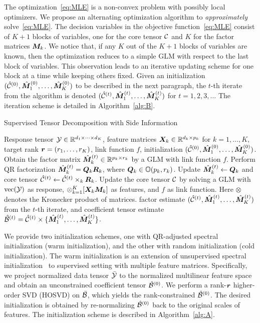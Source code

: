 \documentclass[12pt]{article}
\theoremstyle{definition}
\theoremstyle{definition}
\begin{document}
The optimization~\eqref{eq:MLE} is a non-convex problem with possibly local optimizers. We propose an alternating optimization algorithm to {\it approximately} solve~\eqref{eq:MLE}. 
The decision variables in the objective function~\eqref{eq:MLE} consist of $K+1$ blocks of variables, one for the core tensor $\mathcal{C}$ and $K$ for the factor matrices $\bm M_k$. We notice that, if any $K$ out of the $K+1$ blocks of variables are known, then the optimization reduces to a simple GLM with respect to the last block of variables. This observation leads to an iterative updating scheme for one block at a time while keeping others fixed. Given an initialization $(\hat{\mathcal{C}}^{(0)},\hat{\bm M}_1^{(0)}, \ldots, \hat{\bm M}_K^{(0)})$ to be described in the next paragraph, the $t$-th iterate from the algorithm is denoted $(\hat{\mathcal{C}}^{(t)},  \hat{\bm M}^{(t)}_1,\ldots,\hat{\bm M}^{(t)}_K)$ for $t=1, 2,3, \ldots$ The iteration scheme is detailed in Algorithm~\ref{alg:B}. 
\begin{algorithm}[!h]
\caption{Supervised Tensor Decomposition with Side Information}\label{alg:B}
\begin{algorithmic}[1]
\INPUT Response tensor $\mathcal{Y}\in \mathbb{R}^{d_1\times \cdots \times d_K}$, feature matrices $\bm X_k\in\mathbb{R}^{d_k\times p_k}$ for $k=1,\ldots,K$, target rank $\bm{r}=(r_1,\ldots,r_K)$, link function $f$, initialization $(\hat{\mathcal{C}}^{(0)},\hat {\bm M}^{(0)}_1,\ldots,\hat{\bm M}^{(0)}_K)$.
\State Obtain the factor matrix $\hat{\bm M}^{(t)}_k\in\mathbb{R}^{p_k\times r_k}$ by a GLM with link function $f$.
\State Perform QR factorization $\hat{\bm M}^{(t)}_k=\bm{Q}_k\bm{R}_k$, where $\bm{Q}_k\in\mathbb{O}(p_k, r_k)$.
\State Update $\hat{\bm M}^{(t)}_k\leftarrow \bm{Q}_k$ and core tensor $\hat{\mathcal{C}}^{(t)}\leftarrow \hat{\mathcal{C}}^{(t)}\times_k \bm{R}_k$.
\EndFor
\State Update the core tensor $\mathcal{C}$ by solving a GLM with $\textup{vec}(\mathcal{Y})$ as response, $\otimes_{k=1}^K[ \bm X_k\bm M_k]$ as features, and $f$ as link function. Here $\otimes$ denotes the Kronecker product of matrices. 
\EndFor
\OUTPUT factor estimate $(\hat{\mathcal{C}}^{(t)}, \hat{\bm M}^{(t)}_1,\ldots,\hat{\bm M}^{(t)}_K)$ from the $t$-th iterate, and coefficient tensor estimate $\hat{\mathcal{B}}^{(t)}=\hat{\mathcal{C}}^{(t)}\times\{\hat{\bm M}^{(t)}_1,\ldots, \hat{\bm M}^{(t)}_K\}$.
\end{algorithmic}
\end{algorithm}

{\color{blue}We provide two initialization schemes, one with QR-adjusted spectral initialization (warm initialization), and the other with random initialization (cold initialization). The warm initialization is an extension of unsupervised spectral initialization~\citep{zhang2018tensor} to supervised setting with multiple feature matrices.} Specifically, we project normalized data tensor $\bar {\mathcal{Y}}$ to the normalized multilinear feature space and obtain an unconstrained coefficient tensor $\hat{\mathcal{B}}^{(0)}$. We perform a rank-$\bm{r}$ higher-order SVD (HOSVD) on $\bar {\mathcal{B}}$, which yields the rank-constrained $\hat{\mathcal{B}}^{(0)}$. The desired initialization is obtained by re-normalizing $\hat{\mathcal{B}}^{(0)}$ back to the original scales of features. The initialization scheme is described in Algorithm~\ref{alg:A}. 
\end{document}
